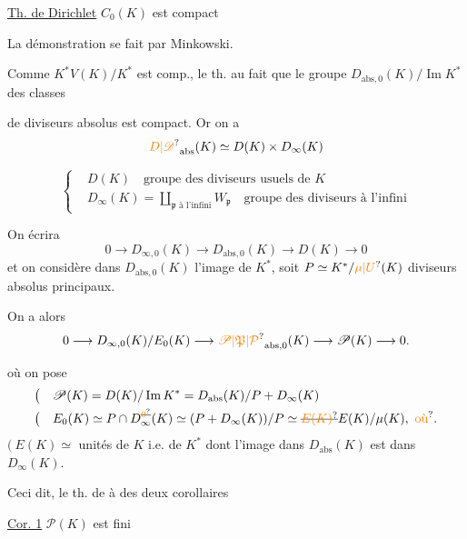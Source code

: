 \uline{Th. de Dirichlet} $C_0(K)$ est compact

La démonstration se fait par Minkowski.

Comme $K^*V(K)/K^*$ est comp., le th.  au fait que le groupe $D_{\mathrm{abs},0}(K)/\operatorname{Im}K^*$ des classes

de diviseurs absolus  est compact. Or on a
\[
{\unsure{D|\mathscr{D}}}_{\mathrm{abs}}(K)\simeq D(K)\times D_\infty(K)
\]

\[
\left\{\begin{aligned}
&D(K)\quad\text{groupe des diviseurs usuels de }K\\
&D_\infty(K)=\coprod_{\mathfrak p\text{ à l'infini}}W_{\mathfrak p}\quad\text{groupe des diviseurs à l'infini}
\end{aligned}\right.
\]

On  écrira
\[
0\longrightarrow D_{\infty,0}(K)\longrightarrow D_{\mathrm{abs},0}(K)\longrightarrow D(K)\longrightarrow0
\]
et on considère dans $D_{\mathrm{abs},0}(K)$ l'image de $K^*$, soit $P\simeq K^*/\unsure{\mu|U}(K)$  diviseurs absolus principaux.

On a alors
\[
0\longrightarrow D_{\infty,0}(K)/E_0(K)\longrightarrow{\unsure{\mathscr{P}|\mathfrak{P}|\mathcal{P}}}_{\mathrm{abs},0}(K)\longrightarrow\mathscr{P}(K)\longrightarrow0.
\]

où on pose
\[
\begin{aligned}
\bigl(\quad&\mathscr{P}(K)=D(K)/\operatorname{Im}K^*=D_{\mathrm{abs}}(K)/P+D_\infty(K)\\
\bigl(\quad&E_0(K)\simeq P\cap D_\infty^{\deleted{\unsure{0}}}(K)\simeq(P+D_\infty(K))/P\simeq\deleted{\unsure{E(K)}}E(K)/\mu(K),\ \text{\unsure{où}}.
\end{aligned}
\]
$\bigl(\ E(K)\simeq$ unités de $K$ i.e.  de $K^*$ dont l'image dans $D_{\mathrm{abs}}(K)$ est dans $D_\infty(K)$.

 Ceci dit, le th. de    à  des deux corollaires

\uline{Cor. 1} $\mathscr{P}(K)$ est fini

